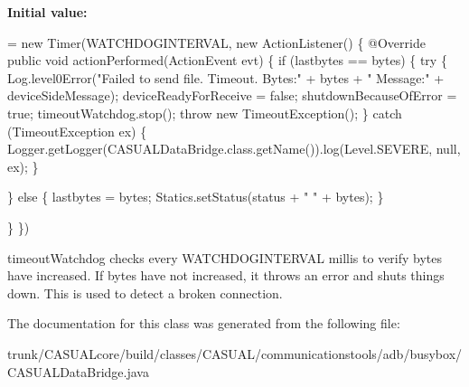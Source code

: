 {\bfseries Initial value\-:}
\begin{DoxyCode}
= \textcolor{keyword}{new} Timer(WATCHDOGINTERVAL, \textcolor{keyword}{new} ActionListener() \{
        @Override
        \textcolor{keyword}{public} \textcolor{keywordtype}{void} actionPerformed(ActionEvent evt) \{
            \textcolor{keywordflow}{if} (lastbytes == bytes) \{
                \textcolor{keywordflow}{try} \{
                    Log.level0Error(\textcolor{stringliteral}{"Failed to send file.  Timeout. Bytes:"} + bytes + \textcolor{stringliteral}{" Message:"} + 
      deviceSideMessage);
                    deviceReadyForReceive = \textcolor{keyword}{false};
                    shutdownBecauseOfError = \textcolor{keyword}{true};
                    timeoutWatchdog.stop();
                    \textcolor{keywordflow}{throw} \textcolor{keyword}{new} TimeoutException();
                \} \textcolor{keywordflow}{catch} (TimeoutException ex) \{
                    Logger.getLogger(CASUALDataBridge.class.getName()).log(Level.SEVERE, null, ex);
                \}

            \} \textcolor{keywordflow}{else} \{
                lastbytes = bytes;
                Statics.setStatus(status + \textcolor{stringliteral}{" "} + bytes);
            \}

        \}
    \})
\end{DoxyCode}
timeout\-Watchdog checks every W\-A\-T\-C\-H\-D\-O\-G\-I\-N\-T\-E\-R\-V\-A\-L millis to verify bytes have increased. If bytes have not increased, it throws an error and shuts things down. This is used to detect a broken connection. 

The documentation for this class was generated from the following file\-:\begin{DoxyCompactItemize}
\item 
trunk/\-C\-A\-S\-U\-A\-Lcore/build/classes/\-C\-A\-S\-U\-A\-L/communicationstools/adb/busybox/C\-A\-S\-U\-A\-L\-Data\-Bridge.\-java\end{DoxyCompactItemize}
